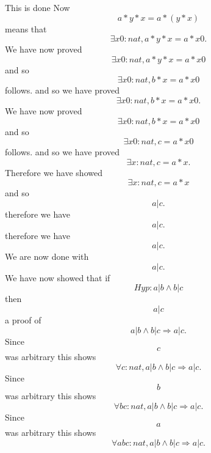 \begin{tcolorbox}[colback=gray!10!white,colframe=white,breakable]
 This is done Now $$a * y * x = a * (y * x) $$ means that $$\exists x0 : nat, a * y * x = a * x0 .$$ We have now proved $$\exists x0 : nat, a * y * x = a * x0 $$ and so $$\exists x0 : nat, b * x = a * x0 $$ follows. and so we have proved $$\exists x0 : nat, b * x = a * x0 .$$ We have now proved $$\exists x0 : nat, b * x = a * x0 $$ and so $$\exists x0 : nat, c = a * x0 $$ follows. and so we have proved $$\exists x : nat, c = a * x .$$ Therefore we have showed $$\exists x : nat, c = a * x $$ and so $$a | c .$$ therefore we have $$a | c .$$ therefore we have $$a | c .$$ We are now done with $$a | c .$$ We have now showed that if $$Hyp : a | b \land b | c $$ then $$a | c $$ a proof of $$a | b \land b | c \Rightarrow a | c .$$ Since $$c$$ was arbitrary this shows $$\forall c : nat, a | b \land b | c \Rightarrow a | c .$$ Since $$b$$ was arbitrary this shows $$\forall b c : nat, a | b \land b | c \Rightarrow a | c .$$ Since $$a$$ was arbitrary this shows $$\forall a b c : nat, a | b \land b | c \Rightarrow a | c .$$
 

\end{tcolorbox}
